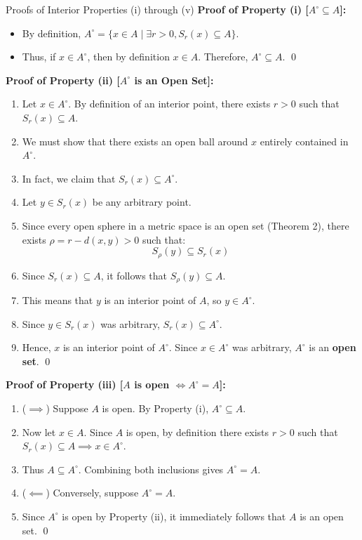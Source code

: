 \documentclass[11pt,a4paper]{article}
\begin{document}
\begin{exbox}{Proofs of Interior Properties (i) through (v)}
\textbf{Proof of Property (i) [$A^\circ \subseteq A$]:}
\begin{itemize}
    \item By definition, $A^\circ = \{x \in A \mid \exists r > 0, S_r(x) \subseteq A\}$.
    \item Thus, if $x \in A^\circ$, then by definition $x \in A$. Therefore, $A^\circ \subseteq A$. \qed
\end{itemize}

\textbf{Proof of Property (ii) [$A^\circ$ is an Open Set]:}
\begin{enumerate}
    \item Let $x \in A^\circ$. By definition of an interior point, there exists $r > 0$ such that $S_r(x) \subseteq A$.
    \item We must show that there exists an open ball around $x$ entirely contained in $A^\circ$.
    \item In fact, we claim that $S_r(x) \subseteq A^\circ$.
    \item Let $y \in S_r(x)$ be any arbitrary point.
    \item Since every open sphere in a metric space is an open set (Theorem 2), there exists $\rho = r - d(x, y) > 0$ such that:
    \begin{equation}
        S_\rho(y) \subseteq S_r(x)
    \end{equation}
    \item Since $S_r(x) \subseteq A$, it follows that $S_\rho(y) \subseteq A$.
    \item This means that $y$ is an interior point of $A$, so $y \in A^\circ$.
    \item Since $y \in S_r(x)$ was arbitrary, $S_r(x) \subseteq A^\circ$.
    \item Hence, $x$ is an interior point of $A^\circ$. Since $x \in A^\circ$ was arbitrary, $A^\circ$ is an \textbf{open set}. \qed
\end{enumerate}

\textbf{Proof of Property (iii) [$A$ is open $\iff A^\circ = A$]:}
\begin{enumerate}
    \item ($\implies$) Suppose $A$ is open. By Property (i), $A^\circ \subseteq A$.
    \item Now let $x \in A$. Since $A$ is open, by definition there exists $r > 0$ such that $S_r(x) \subseteq A \implies x \in A^\circ$.
    \item Thus $A \subseteq A^\circ$. Combining both inclusions gives $A^\circ = A$.
    \item ($\impliedby$) Conversely, suppose $A^\circ = A$.
    \item Since $A^\circ$ is open by Property (ii), it immediately follows that $A$ is an open set. \qed
\end{enumerate}


\end{exbox}
\end{document}
